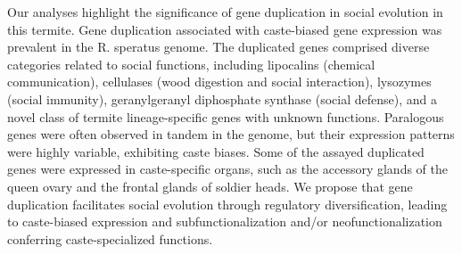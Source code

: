 \documentclass[11pt]{article}
\begin{document}
\begin{sloppypar}
Our analyses highlight the significance of gene duplication in social evolution in this termite. 
Gene duplication associated with caste-biased gene expression was prevalent in the R. speratus genome. 
The duplicated genes comprised diverse categories related to social functions, including lipocalins (chemical communication), cellulases (wood digestion and social interaction), lysozymes (social immunity), geranylgeranyl diphosphate synthase (social defense), and a novel class of termite lineage-specific genes with unknown functions. 
Paralogous genes were often observed in tandem in the genome, but their expression patterns were highly variable, exhibiting caste biases. 
Some of the assayed duplicated genes were expressed in caste-specific organs, such as the accessory glands of the queen ovary and the frontal glands of soldier heads. 
We propose that gene duplication facilitates social evolution through regulatory diversification, leading to caste-biased expression and subfunctionalization and/or neofunctionalization conferring caste-specialized functions.

\end{sloppypar}
\end{document}
